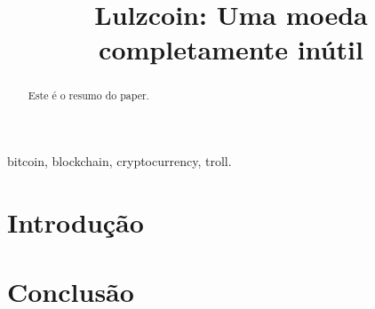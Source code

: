 \documentclass[conference]{IEEEtran}
\begin{document}
\title{Lulzcoin: Uma moeda completamente inútil}
\author{
}

\maketitle

\begin{abstract}
Este é o resumo do paper. \blindtext[1]
\end{abstract}

\begin{IEEEkeywords}
bitcoin, blockchain, cryptocurrency, troll.
\end{IEEEkeywords}

\section{Introdução}
\blindtext

\section{Conclusão}
\blindtext
\end{document}
